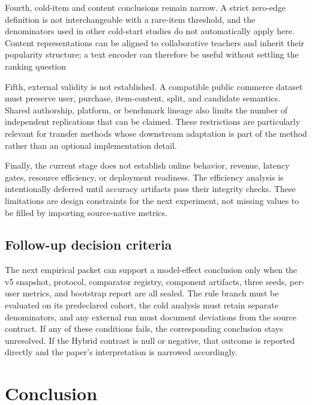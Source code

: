\documentclass[10pt,a4paper]{article}
\begin{document}
Fourth, cold-item and content conclusions remain narrow. A strict zero-edge
definition is not interchangeable with a rare-item threshold, and the
denominators used in other cold-start studies do not automatically apply here.
Content representations can be aligned to collaborative teachers and inherit
their popularity structure; a text encoder can therefore be useful without
settling the ranking question \cite{huang2023_aldi} %
\cite{meehan2026_semco} %

Fifth, external validity is not established. A compatible public commerce
dataset must preserve user, purchase, item-content, split, and candidate
semantics. Shared authorship, platform, or benchmark lineage also limits the
number of independent replications that can be claimed. These restrictions are
particularly relevant for transfer methods whose downstream adaptation is part
of the method rather than an optional implementation detail.

Finally, the current stage does not establish online behavior, revenue, latency
gates, resource efficiency, or deployment readiness. The efficiency analysis is
intentionally deferred until accuracy artifacts pass their integrity checks.
These limitations are design constraints for the next experiment, not missing
values to be filled by importing source-native metrics.

\subsection{Follow-up decision criteria}

The next empirical packet can support a model-effect conclusion only when the
v5 snapshot, protocol, comparator registry, component artifacts, three seeds,
per-user metrics, and bootstrap report are all sealed. The rule branch must be
evaluated on its predeclared cohort, the cold analysis must retain separate
denominators, and any external run must document deviations from the source
contract. If any of these conditions fails, the corresponding conclusion stays
unresolved. If the Hybrid contrast is null or negative, that outcome is
reported directly and the paper's interpretation is narrowed accordingly.

\section{Conclusion}
\end{document}
